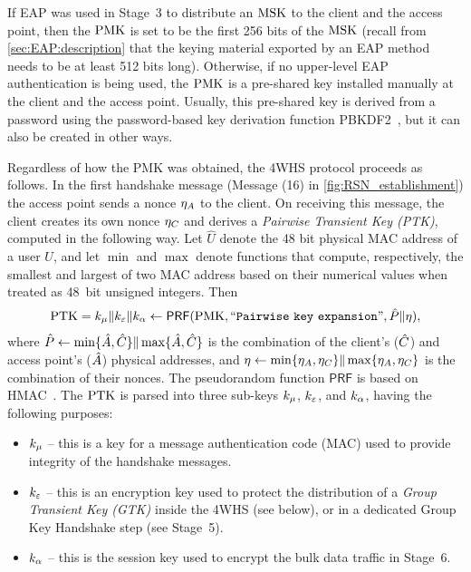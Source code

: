 If EAP was used in Stage~3 to distribute an $\mathrm{MSK}$ to the client and the access point,
then the $\mathrm{PMK}$ is set to be the first 256 bits of the $\mathrm{MSK}$
(recall from \cref{sec:EAP:description} that the keying material exported by an EAP method needs to be at least 512 bits long).
Otherwise,
if no upper-level EAP authentication is being used,
the $\mathrm{PMK}$ is a pre-shared key installed manually at the client and the access point.
Usually,
this pre-shared key is derived from a password using the password-based key derivation function PBKDF2~\cite{IETF:RFC8018:PBKDF2},
but it can also be created in other ways.


Regardless of how the PMK was obtained,
the 4WHS protocol proceeds as follows.
In the first handshake message  
(Message (16) in \cref{fig:RSN_establishment})
the access point sends a nonce $\eta_A$ to the client.
On receiving this message,
the client creates its own nonce $\eta_C$ and derives a \emph{Pairwise Transient Key (PTK)},
computed in the following way.
Let $\hat{U}$ denote the 48 bit physical MAC address of a user $U$,
and let $\min$ and $\max$ denote functions that compute,
respectively,
the smallest and largest of two MAC address based on their numerical values when treated as  48~bit unsigned integers. 
Then
\begin{gather}\label{eq:ptk_derivation_function}
	\mathrm{PTK} = k_\mu \| k_\varepsilon \| k_{\alpha} 
		\gets \operatorname{\mathsf{PRF}}(\mathrm{PMK}, ``\mathtt{Pairwise\ key\ expansion}", \hat{P} \| \eta ), 
\end{gather}
where $	\hat{P} \gets \min \lbrace \hat{A}, \hat{C} \rbrace \| \max \lbrace \hat{A}, \hat{C} \rbrace	$
is the combination of the client's ($\hat{C}$) and access point's ($\hat{A}$) physical addresses,
and $\eta \gets \min \lbrace \eta_A, \eta_C \rbrace \| \max \lbrace \eta_A, \eta_C \rbrace$
is the combination of their nonces.
The pseudorandom function $\mathsf{PRF}$ is based on HMAC~\cite{IETF:RFC2104:HMAC}.
The $\mathrm{PTK}$ is parsed into three sub-keys $k_\mu$, $k_\varepsilon$, and $k_{\alpha}$,
having the following purposes:
\begin{itemize}
	\item $k_\mu$ -- this is a key for a message authentication code (MAC) used to provide integrity of the handshake messages.
	
	\item $k_\varepsilon$ -- this is an encryption key used to protect the distribution of a \emph{Group Transient Key (GTK)}
	inside the 4WHS (see below),
	or in a dedicated Group Key Handshake step (see Stage~5). 
	
	\item $k_\alpha$ -- this is the session key used to encrypt the bulk data traffic in Stage~6.
\end{itemize}
 
